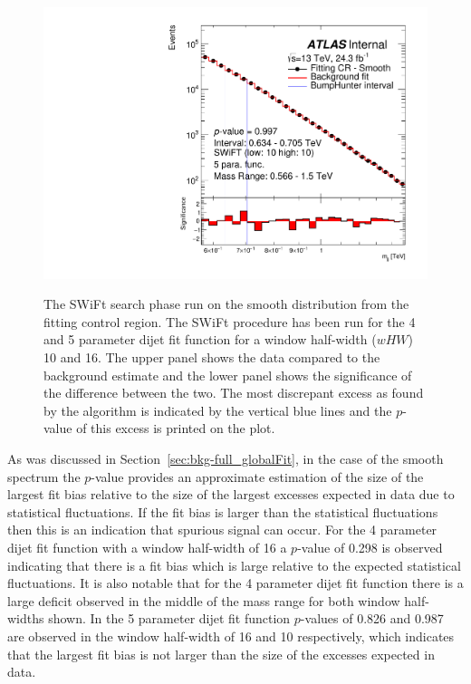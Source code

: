 \begin{figure}[!htb]
 {
  \includegraphics[width=0.45\linewidth, angle=0]{figs/Dibjet/LowMass/FitStudy_min566/bhFit_corrFitCR_smooth_5para_low10_high10.pdf}
}

\caption{\label{fig:bhFit_lm_corrFitCR_smooth}
  The SWiFt search phase run on the smooth distribution from the \lm{} fitting control region.
  The SWiFt procedure has been run for the 4 and 5 parameter dijet fit function for a window half-width ($wHW$) 10 and 16.
  The upper panel shows the data compared to the background estimate and the lower panel shows the significance of the difference between the two.
  The most discrepant excess as found by the \bh{} algorithm is indicated by the vertical blue lines and the \mbox{$p$-value} of this excess is printed on the plot. }
\end{figure}

As was discussed in Section~\ref{sec:bkg-full_globalFit}, in the case of the smooth spectrum the \bh{} \mbox{$p$-value} provides an approximate estimation
of the size of the largest fit bias relative to the size of the largest excesses expected in data due to statistical fluctuations.
If the fit bias is larger than the statistical fluctuations then this is an indication that spurious signal can occur. 
For the 4 parameter dijet fit function with a window half-width of 16 a \bh{} $p$-value of 0.298 is observed indicating that
there is a fit bias which is large relative to the expected statistical fluctuations.
It is also notable that for the 4 parameter dijet fit function there is a large deficit observed in the middle of the mass range for both window half-widths shown.
In the 5 parameter dijet fit function \bh{} $p$-values of 0.826 and 0.987 are observed in the window half-width of 16 and 10 respectively,
which indicates that the largest fit bias is not larger than the size of the excesses expected in data.

